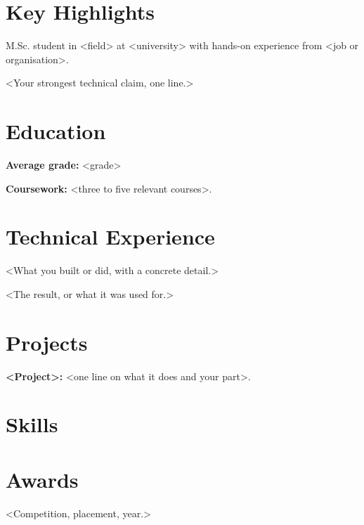 \documentclass{cv}
\begin{document}
\makecvheader

\section{Key Highlights}
\begin{bullets}
  \item M.Sc. student in <field> at <university> with hands-on experience from <job or organisation>. %
  \item <Your strongest technical claim, one line.> %
\end{bullets}

\section{Education}
\begin{bullets}
  \item \textbf{Average grade:} <grade> %
  \item \textbf{Coursework:} <three to five relevant courses>. %
\end{bullets}

\section{Technical Experience}
\begin{bullets}
  \item <What you built or did, with a concrete detail.> %
  \item <The result, or what it was used for.> %
\end{bullets}

\section{Projects}
\begin{bullets}
  \item \textbf{<Project>:} <one line on what it does and your part>. %
\end{bullets}

\section{Skills}
\begin{skills}
\end{skills}

\section{Awards}
\begin{bullets}
  \item <Competition, placement, year.> %
\end{bullets}
\end{document}
